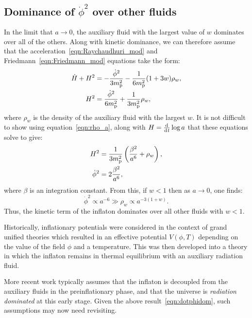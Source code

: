 \subsection{Dominance of \(\dot{\phi}^2\) over other fluids}
\label{sec:dominance_fluids}
In the limit that \(a\to 0\), the auxiliary fluid with the largest value of \(w\) dominates over all of the others. Along with kinetic dominance, we can therefore assume that the acceleration~\eqref{eqn:Raychaudhuri_mod} and Friedmann~\eqref{eqn:Friedmann_mod} equations take the form:
\begin{align}
  \dot{H}+H^2 
  &= 
  -\frac{\dot{\phi}^2}{3m_{\mathrm{p}}^2} - \frac{1}{6m_{\mathrm{p}}^2}(1+3w)\rho_w,
  \label{eqn:Ray_KD_eq_rho}
  \\
  H^2 
  &= 
  \frac{\dot{\phi}^2}{6m_{\mathrm{p}}^2} +  \frac{1}{3m_{\mathrm{p}}^2}\rho_w,
  \label{eqn:Friedmann_KD_eq_rho}
\end{align}
where \(\rho_w\) is the density of the auxiliary fluid with the largest \(w\).  It is not difficult to show using equation~\eqref{eqn:rho_a},
along with \(H=\frac{\operatorname{d}^{}\!{}}{\operatorname{d}^{}\!{t}}\log a\) that these equations solve to give:
\begin{align}
  H^2 
  &= 
  \frac{1}{3m_{\mathrm{p}}^2}\left(\frac{\beta^2}{a^6} + \rho_w\right),
  \label{eqn:H_of_a_1}
  \\
  \dot{\phi}^2 
  &= 
  2\frac{\beta^2}{a^6},
  \label{eqn:dotphi_of_a_1}
\end{align}
where \(\beta\) is an integration constant. From this, if \(w<1\) then as
\(a\to 0\), one finds:
\begin{equation}
  \dot{\phi}^2 \propto a^{-6} 
  \gg
  \rho_w \propto a^{-3(1+w)}.
  \label{eqn:dotphidom}
\end{equation}
Thus, the kinetic term of the inflaton dominates over all other fluids with \(w<1\).




Historically, inflationary potentials were considered in the context of grand unified theories \citep{PhysRevLett.48.1220,linde_1982} which resulted in an effective potential \(V(\phi,T)\) depending on the value of the field \(\phi\) and a temperature.  This was then developed \citep{1995PhRvL..74.1912B,PhysRevLett.75.3218} into a theory in which the inflaton remains in thermal equilibrium with an auxiliary radiation fluid.

More recent work \citep{2007PhRvD..76f3512P} typically assumes that the inflaton is decoupled from the auxiliary fluids in the preinflationary phase, and that the universe is {\em radiation dominated\/} at this early stage. Given the above result~\eqref{eqn:dotphidom}, such assumptions may now need revisiting.



